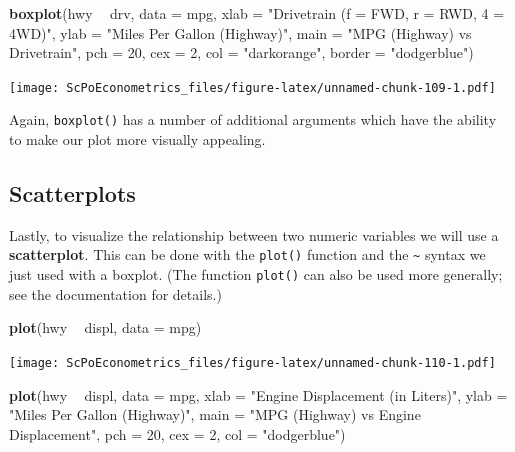 \documentclass[]{book}
\newenvironment{Shaded}{\begin{snugshade}}{\end{snugshade}}
\newcommand{\KeywordTok}[1]{\textcolor[rgb]{0.13,0.29,0.53}{\textbf{#1}}}
\newcommand{\DataTypeTok}[1]{\textcolor[rgb]{0.13,0.29,0.53}{#1}}
\newcommand{\DecValTok}[1]{\textcolor[rgb]{0.00,0.00,0.81}{#1}}
\newcommand{\StringTok}[1]{\textcolor[rgb]{0.31,0.60,0.02}{#1}}
\newcommand{\OperatorTok}[1]{\textcolor[rgb]{0.81,0.36,0.00}{\textbf{#1}}}
\newcommand{\NormalTok}[1]{#1}
\theoremstyle{definition}
\theoremstyle{definition}
\theoremstyle{definition}
\theoremstyle{remark}
\begin{document}
\begin{Shaded}
\begin{Highlighting}[]
\KeywordTok{boxplot}\NormalTok{(hwy }\OperatorTok{~}\StringTok{ }\NormalTok{drv, }\DataTypeTok{data =}\NormalTok{ mpg,}
     \DataTypeTok{xlab   =} \StringTok{"Drivetrain (f = FWD, r = RWD, 4 = 4WD)"}\NormalTok{,}
     \DataTypeTok{ylab   =} \StringTok{"Miles Per Gallon (Highway)"}\NormalTok{,}
     \DataTypeTok{main   =} \StringTok{"MPG (Highway) vs Drivetrain"}\NormalTok{,}
     \DataTypeTok{pch    =} \DecValTok{20}\NormalTok{,}
     \DataTypeTok{cex    =} \DecValTok{2}\NormalTok{,}
     \DataTypeTok{col    =} \StringTok{"darkorange"}\NormalTok{,}
     \DataTypeTok{border =} \StringTok{"dodgerblue"}\NormalTok{)}
\end{Highlighting}
\end{Shaded}

\texttt{[image: ScPoEconometrics\_files/figure-latex/unnamed-chunk-109-1.pdf]}

Again, \texttt{boxplot()} has a number of additional arguments which
have the ability to make our plot more visually appealing.

\subsection{Scatterplots}\label{scatterplots}

Lastly, to visualize the relationship between two numeric variables we
will use a \textbf{scatterplot}. This can be done with the
\texttt{plot()} function and the \texttt{\textasciitilde{}} syntax we
just used with a boxplot. (The function \texttt{plot()} can also be used
more generally; see the documentation for details.)

\begin{Shaded}
\begin{Highlighting}[]
\KeywordTok{plot}\NormalTok{(hwy }\OperatorTok{~}\StringTok{ }\NormalTok{displ, }\DataTypeTok{data =}\NormalTok{ mpg)}
\end{Highlighting}
\end{Shaded}

\texttt{[image: ScPoEconometrics\_files/figure-latex/unnamed-chunk-110-1.pdf]}

\begin{Shaded}
\begin{Highlighting}[]
\KeywordTok{plot}\NormalTok{(hwy }\OperatorTok{~}\StringTok{ }\NormalTok{displ, }\DataTypeTok{data =}\NormalTok{ mpg,}
     \DataTypeTok{xlab =} \StringTok{"Engine Displacement (in Liters)"}\NormalTok{,}
     \DataTypeTok{ylab =} \StringTok{"Miles Per Gallon (Highway)"}\NormalTok{,}
     \DataTypeTok{main =} \StringTok{"MPG (Highway) vs Engine Displacement"}\NormalTok{,}
     \DataTypeTok{pch  =} \DecValTok{20}\NormalTok{,}
     \DataTypeTok{cex  =} \DecValTok{2}\NormalTok{,}
     \DataTypeTok{col  =} \StringTok{"dodgerblue"}\NormalTok{)}
\end{Highlighting}
\end{Shaded}
\end{document}
